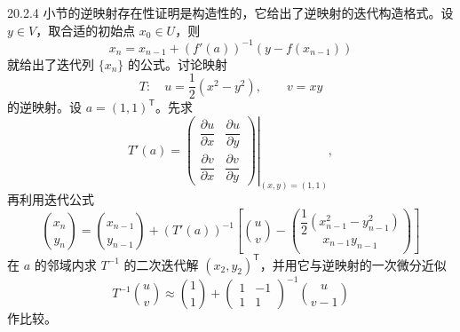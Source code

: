 \begin{xreferenceproblem}[4]
20.2.4 小节的逆映射存在性证明是构造性的，它给出了逆映射的迭代构造格式。设 $y\in V$，取合适的初始点 $x_0\in U$，则
  \[
    x_n=x_{n-1}+(f'(a))^{-1}(y-f(x_{n-1}))
  \]
  就给出了迭代列 $\{x_n\}$ 的公式。讨论映射
  \[
    T:\quad u=\frac12(x^2-y^2),\qquad v=xy
  \]
  的逆映射。设 $a=(1,1)^{\mathsf T}$。先求
  \[
    T'(a)=\left.\begin{pmatrix}
      \dfrac{\partial u}{\partial x}&\dfrac{\partial u}{\partial y}\\[4pt]
      \dfrac{\partial v}{\partial x}&\dfrac{\partial v}{\partial y}
    \end{pmatrix}\right|_{(x,y)=(1,1)},
  \]
  再利用迭代公式
  \[
    \binom{x_n}{y_n}=\binom{x_{n-1}}{y_{n-1}}
    +(T'(a))^{-1}\left[
      \binom uv-
      \binom{\dfrac12(x_{n-1}^2-y_{n-1}^2)}{x_{n-1}y_{n-1}}
    \right]
  \]
  在 $a$ 的邻域内求 $T^{-1}$ 的二次迭代解 $(x_2,y_2)^{\mathsf T}$，并用它与逆映射的一次微分近似
  \[
    T^{-1}\binom uv\approx
    \binom11+\begin{pmatrix}1&-1\\1&1\end{pmatrix}^{-1}
    \binom u{v-1}
  \]
  作比较。
\end{xreferenceproblem}
